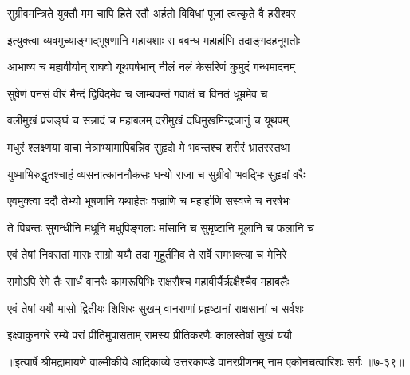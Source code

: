 \twolineshloka
{सुग्रीवमन्त्रिते युक्तौ मम चापि हिते रतौ}
{अर्हतो विविधां पूजां त्वत्कृते वै हरीश्वर} %

\twolineshloka
{इत्युक्त्वा व्यवमुच्याङ्गाद्भूषणानि महायशाः}
{स बबन्ध महार्हाणि तदाङ्गदहनूमतोः} %

\twolineshloka
{आभाष्य च महावीर्यान् राघवो यूथपर्षभान्}
{नीलं नलं केसरिणं कुमुदं गन्धमादनम्} %

\twolineshloka
{सुषेणं पनसं वीरं मैन्दं द्विविदमेव च}
{जाम्बवन्तं गवाक्षं च विनतं धूम्रमेव च} %

\twolineshloka
{वलीमुखं प्रजङ्घं च सन्नादं च महाबलम्}
{दरीमुखं दधिमुखमिन्द्रजानुं च यूथपम्} %

\twolineshloka
{मधुरं श्लक्ष्णया वाचा नेत्राभ्यामापिबन्निव}
{सुहृदो मे भवन्तश्च शरीरं भ्रातरस्तथा} %

\twolineshloka
{युष्माभिरुद्धृतश्चाहं व्यसनात्काननौकसः}
{धन्यो राजा च सुग्रीवो भवद्भिः सुहृदां वरैः} %

\twolineshloka
{एवमुक्त्वा ददौ तेभ्यो भूषणानि यथार्हतः}
{वज्राणि च महार्हाणि सस्वजे च नरर्षभः} %

\twolineshloka
{ते पिबन्तः सुगन्धीनि मधूनि मधुपिङ्गलाः}
{मांसानि च सुमृष्टानि मूलानि च फलानि च} %

\twolineshloka
{एवं तेषां निवसतां मासः साग्रो ययौ तदा}
{मुहूर्तमिव ते सर्वे रामभक्त्या च मेनिरे} %

\twolineshloka
{रामोऽपि रेमे तैः सार्धं वानरैः कामरूपिभिः}
{राक्षसैश्च महावीर्यैर्ऋक्षैश्चैव महाबलैः} %

\twolineshloka
{एवं तेषां ययौ मासो द्वितीयः शिशिरः सुखम्}
{वानराणां प्रहृष्टानां राक्षसानां च सर्वशः} %

\twolineshloka
{इक्ष्वाकुनगरे रम्ये परां प्रीतिमुपासताम्}
{रामस्य प्रीतिकरणैः कालस्तेषां सुखं ययौ} %


॥इत्यार्षे श्रीमद्रामायणे वाल्मीकीये आदिकाव्ये उत्तरकाण्डे वानरप्रीणनम् नाम एकोनचत्वारिंशः सर्गः ॥७-३९॥
